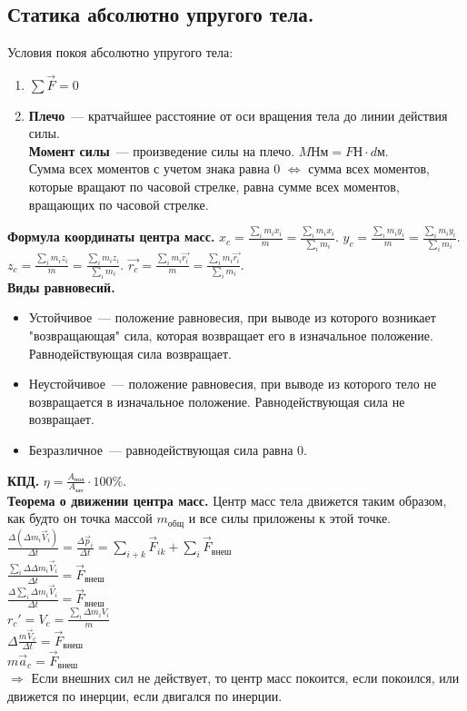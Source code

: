 \documentclass{article}
\begin{document}
	\subsection{Статика абсолютно упругого тела.}
	Условия покоя абсолютно упругого тела:
	\begin{enumerate}
		\item $\sum \vec{F} = 0$
		\item \textbf{Плечо}~--- кратчайшее расстояние от оси вращения тела до линии действия силы. \\
		\textbf{Момент силы}~--- произведение силы на плечо. $M \text{Нм} = F \text{Н} \cdot d \text{м}$. \\
		Сумма всех моментов с учетом знака равна $0$ $\Leftrightarrow$ сумма всех моментов, которые вращают по часовой стрелке, равна сумме всех моментов, вращающих по часовой стрелке.
	\end{enumerate}
	\textbf{Формула координаты центра масс.} $x_c = \frac{\sum\limits_i m_i x_i}{m} = \frac{\sum\limits_i m_i x_i}{\sum\limits_i m_i}$. $y_c = \frac{\sum\limits_i m_i y_i}{m} = \frac{\sum\limits_i m_i y_i}{\sum\limits_i m_i}$. $z_c = \frac{\sum\limits_i m_i z_i}{m} = \frac{\sum\limits_i m_i z_i}{\sum\limits_i m_i}$. $\vec{r_c} = \frac{\sum\limits_i m_i \vec{r_i}}{m} = \frac{\sum\limits_i m_i \vec{r_i}}{\sum\limits_i m_i}$. \\
	\textbf{Виды равновесий.}
	\begin{itemize}
		\item Устойчивое~--- положение равновесия, при выводе из которого возникает "возвращающая" сила, которая возвращает его в изначальное положение. Равнодействующая сила возвращает.
		\item Неустойчивое~--- положение равновесия, при выводе из которого тело не возвращается в изначальное положение. Равнодействующая сила не возвращает.
		\item Безразличное~--- равнодействующая сила равна $0$.
	\end{itemize}
	\textbf{КПД.} $\eta = \frac{A_{\text{пол}}}{A_{\text{зат}}} \cdot 100\%$. \\
	\textbf{Теорема о движении центра масс.} Центр масс тела движется таким образом, как будто он точка массой $m_{\text{общ}}$ и все силы приложены к этой точке. \\
	$\frac{\varDelta (\varDelta m_i \vec{V}_i)}{\varDelta t} = \frac{\varDelta \vec{p}_i}{\varDelta t} = \sum\limits_{i + k} \vec{F}_{ik} + \sum\limits_i \vec{F}_{\text{внеш}}$ \\
	$\frac{\sum\limits_i \varDelta \varDelta m_i \vec{V}_i}{\varDelta t} = \vec{F}_{\text{внеш}}$ \\
	$\frac{\varDelta \sum\limits_i \varDelta m_i \vec{V}_i}{\varDelta t} = \vec{F}_{\text{внеш}}$ \\
	$r_c' = V_c = \frac{\sum\limits_i \varDelta m_i V_i}{m}$ \\
	$\varDelta \frac{m \vec{V}_c}{\varDelta t} = \vec{F}_{\text{внеш}}$ \\
	$m \vec{a}_c = \vec{F}_{\text{внеш}}$ \\
	$\Rightarrow$ Если внешних сил не действует, то центр масс покоится, если покоился, или движется по инерции, если двигался по инерции.
\end{document}
